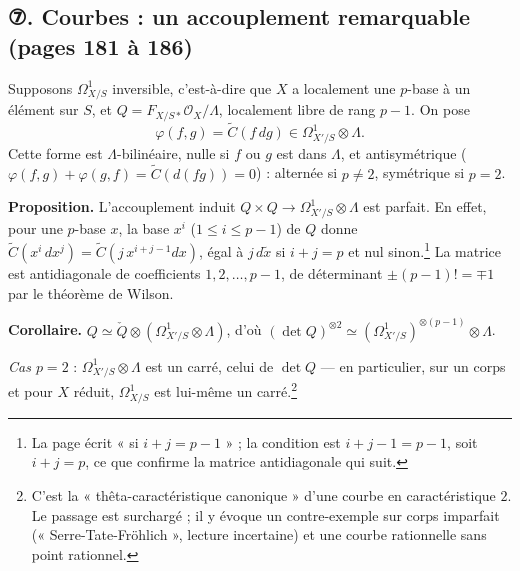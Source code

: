 \documentclass[11pt,a4paper]{article}
\begin{document}
\subsection*{⑦. Courbes : un accouplement remarquable (pages 181 à 186)}

Supposons $\Omega^1_{X/S}$ inversible, c'est-à-dire que $X$ a localement une
$p$-base à un élément sur $S$, et $Q = F_{X/S*}\mathcal{O}_X/\Lambda$, localement
libre de rang $p - 1$. On pose
\[
  \varphi(f,g) = \widetilde C(f\,dg) \in \Omega^1_{X'/S} \otimes \Lambda .
\]
Cette forme est $\Lambda$-bilinéaire, nulle si $f$ ou $g$ est dans $\Lambda$,
et antisymétrique ($\varphi(f,g) + \varphi(g,f) = \widetilde C(d(fg)) = 0$) :
alternée si $p \neq 2$, symétrique si $p = 2$.

\textbf{Proposition.} L'accouplement induit $Q \times Q \to \Omega^1_{X'/S}
\otimes \Lambda$ est parfait. En effet, pour une $p$-base $x$, la base
$x^i$ ($1 \leq i \leq p-1$) de $Q$ donne $\widetilde C(x^i\,dx^j) =
\widetilde C(j\,x^{i+j-1}dx)$, égal à $j\,d\tilde x$ si $i + j = p$ et nul
sinon.\footnote{La page écrit « si $i + j = p - 1$ » ; la condition est
$i + j - 1 = p - 1$, soit $i + j = p$, ce que confirme la matrice
antidiagonale qui suit.} La matrice est antidiagonale de coefficients $1, 2,
\ldots, p-1$, de déterminant $\pm (p-1)! = \mp 1$ par le théorème de Wilson.

\textbf{Corollaire.} $Q \simeq \check Q \otimes (\Omega^1_{X'/S} \otimes \Lambda)$,
d'où $(\det Q)^{\otimes 2} \simeq (\Omega^1_{X'/S})^{\otimes(p-1)} \otimes
\Lambda$.

\emph{Cas $p = 2$} : $\Omega^1_{X'/S} \otimes \Lambda$ est un carré, celui de
$\det Q$ — en particulier, sur un corps et pour $X$ réduit,
$\Omega^1_{X/S}$ est lui-même un carré.\footnote{C'est la « thêta-caractéristique
canonique » d'une courbe en caractéristique $2$. Le passage est surchargé ; il
y évoque un contre-exemple sur corps imparfait (« Serre-Tate-Fröhlich »,
lecture incertaine) et une courbe rationnelle sans point rationnel.}
\end{document}
